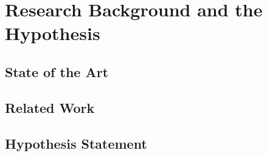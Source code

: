 \chapter{Research Background and the Hypothesis}
\label{chap:kapitel2}



	\section{State of the Art}
	\label{sec:state-of-the-art}



	\section{Related Work}
	\label{sec:related-work}
	
	
	
	\section{Hypothesis Statement}
	\label{sec:hypothesis-statement}	
	
	
	



			